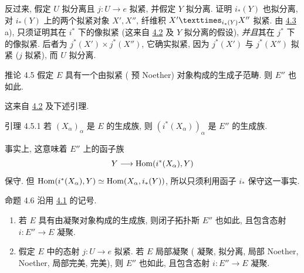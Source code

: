 反过来, 假定 $U$ 拟分离且 $j:U\to e$ 拟紧,
并假定 $Y$ 拟分离.
证明 $i_{\ast}(Y)$ 也拟分离,
\ie 对 $i_{\ast}(Y)$ 上的两个拟紧对象 $X',X''$,
纤维积 $\fprod{X'}{X''}{i_{\ast}(Y)}$ 拟紧.
由 \hyperref[VI.cor4.3]{4.3} a),
只须证明其在 $i^{\ast}$ 下的像拟紧\pageoriginale{}
(这来自 \hyperref[VI.prop4.2]{4.2} 及 $Y$ 拟分离的假设),
\emph{并且}其在 $j^{\ast}$ 下的像拟紧.
后者为 $j^{\ast}(X')\times j^{\ast}(X'')$,
它确实拟紧,
因为 $j^{\ast}(X')$ 与 $j^{\ast}(X'')$ 拟紧
($j$ 拟紧), 而 $U$ 拟分离.

\begin{enonce*}{推论 4.5}
假定 $E$ 具有一个由拟紧
(\emph{\resp} 预 Noether) 对象构成的生成子范畴.
则 $E''$ 也如此.
\end{enonce*}

这来自 \hyperref[VI.prop4.2]{4.2} 及下述引理.

\begin{enonce*}{引理 4.5.1}
若 $(X_{\alpha})_{\alpha}$ 是 $E$ 的生成族,
则 $(i^{\ast}(X_{\alpha}))_{\alpha}$ 是 $E''$ 的生成族.
\end{enonce*}

事实上, 这意味着 $E''$ 上的函子族
$$
Y \to \Hom (i^{\ast}(X_{\alpha}), Y)
$$
保守.
但 $\operatorname{Hom}(i^{\ast}(X_{\alpha}),Y)\simeq\operatorname{Hom}(X_{\alpha},i_{\ast}(Y))$,
所以只须利用函子 $i_{\ast}$ 保守这一事实.

\begin{enonce*}{命题 4.6}
沿用 \hyperref[VI.subsec4.1]{4.1} 的记号.
\begin{enumerate}
\renewcommand{\theenumi}{\alph{enumi}}
\renewcommand{\labelenumi}{\theenumi)}
\item 若 $E$ 具有由凝聚对象构成的生成族,
则闭子拓扑斯 $E''$ 也如此,
且包含态射 $i:E''\to E$ 凝聚.

\item 假定 $E$ 中的态射 $j:U\to e$ 拟紧.
若\pageoriginale{} $E$ 局部凝聚
(\emph{\resp} 凝聚,
\emph{\resp} 拟分离,
\emph{\resp} 局部 Noether,
\emph{\resp} Noether,
\emph{\resp} 局部完美,
\emph{\resp} 完美),
则 $E''$ 也如此, 且包含态射 $i:E''\to E$ 凝聚.
\end{enumerate}
\end{enonce*}

